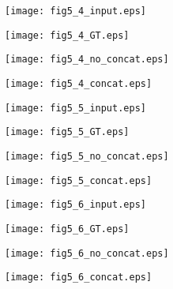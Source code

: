 \documentclass[runningheads]{llncs}
\begin{document}
\begin{figure}[p]
    \begin{minipage}{.22\textwidth}
        \centering
        \texttt{[image: fig5\_4\_input.eps]}
    \end{minipage}\begin{minipage}{0.25\textwidth}
        \centering
        \texttt{[image: fig5\_4\_GT.eps]}
    \end{minipage}
    \begin{minipage}{0.25\textwidth}
        \centering
        \texttt{[image: fig5\_4\_no\_concat.eps]}
    \end{minipage}
    \begin{minipage}{0.25\textwidth}
        \centering
        \texttt{[image: fig5\_4\_concat.eps]}
    \end{minipage}

    \begin{minipage}{.22\textwidth}
        \centering
        \texttt{[image: fig5\_5\_input.eps]}
    \end{minipage}\begin{minipage}{0.25\textwidth}
        \centering
        \texttt{[image: fig5\_5\_GT.eps]}
    \end{minipage}
    \begin{minipage}{0.25\textwidth}
        \centering
        \texttt{[image: fig5\_5\_no\_concat.eps]}
    \end{minipage}
    \begin{minipage}{0.25\textwidth}
        \centering
        \texttt{[image: fig5\_5\_concat.eps]}
    \end{minipage}

    \begin{minipage}{.22\textwidth}
        \centering
        \texttt{[image: fig5\_6\_input.eps]}
    \end{minipage}\begin{minipage}{0.25\textwidth}
        \centering
        \texttt{[image: fig5\_6\_GT.eps]}
    \end{minipage}
    \begin{minipage}{0.25\textwidth}
        \centering
        \texttt{[image: fig5\_6\_no\_concat.eps]}
    \end{minipage}
    \begin{minipage}{0.25\textwidth}
        \centering
        \texttt{[image: fig5\_6\_concat.eps]}
    \end{minipage}


\end{figure}
\end{document}

